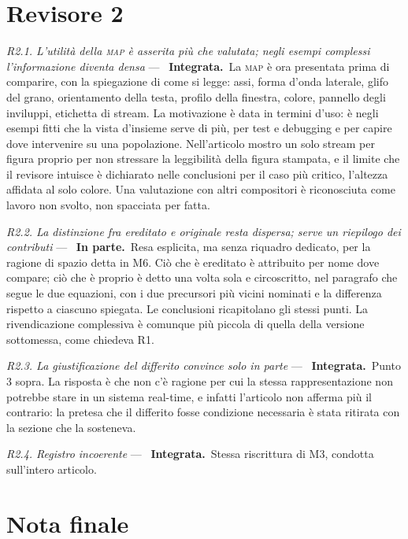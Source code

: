 \documentclass[11pt,a4paper]{article}
\newcommand{\integrata}{\textbf{Integrata.}}
\newcommand{\parziale}{\textbf{In parte.}}
\newenvironment{rilievi}
  {\begin{list}{}{%
    \setlength{\leftmargin}{1.6em}\setlength{\itemindent}{-1.6em}%
    \setlength{\itemsep}{4pt}\setlength{\parsep}{0pt}\setlength{\topsep}{4pt}}}
  {\end{list}}
\newcommand{\voce}[1]{\item \textit{#1} ---\ }
\begin{document}
\section*{Revisore 2}

\begin{rilievi}

\voce{R2.1. L'utilità della \textsc{map} è asserita più che valutata; negli
esempi complessi l'informazione diventa densa} \integrata\ La \textsc{map} è
ora presentata prima di comparire, con la spiegazione di come si legge: assi,
forma d'onda laterale, glifo del grano, orientamento della testa, profilo
della finestra, colore, pannello degli inviluppi, etichetta di stream. La
motivazione è data in termini d'uso: è negli esempi fitti che la vista
d'insieme serve di più, per test e debugging e per capire dove intervenire
su una popolazione. Nell'articolo mostro un solo stream per figura proprio
per non stressare la leggibilità della figura stampata, e il limite che il
revisore intuisce è dichiarato nelle conclusioni per il caso più critico,
l'altezza affidata al solo colore. Una valutazione con altri compositori è
riconosciuta come lavoro non svolto, non spacciata per fatta.

\voce{R2.2. La distinzione fra ereditato e originale resta dispersa; serve
un riepilogo dei contributi} \parziale\ Resa esplicita, ma senza riquadro
dedicato, per la ragione di spazio detta in M6. Ciò che è ereditato è
attribuito per nome dove compare; ciò che è proprio è detto una volta sola e
circoscritto, nel paragrafo che segue le due equazioni, con i due precursori
più vicini nominati e la differenza rispetto a ciascuno spiegata. Le
conclusioni ricapitolano gli stessi punti. La rivendicazione complessiva è
comunque più piccola di quella della versione sottomessa, come chiedeva R1.

\voce{R2.3. La giustificazione del differito convince solo in parte}
\integrata\ Punto 3 sopra. La risposta è che non c'è ragione per cui la
stessa rappresentazione non potrebbe stare in un sistema real-time, e
infatti l'articolo non afferma più il contrario: la pretesa che il differito
fosse condizione necessaria è stata ritirata con la sezione che la
sosteneva.

\voce{R2.4. Registro incoerente} \integrata\ Stessa riscrittura di M3,
condotta sull'intero articolo.

\end{rilievi}

\section*{Nota finale}
\end{document}
